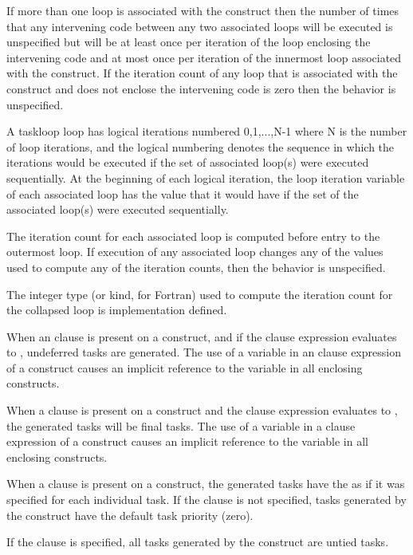 If more than one loop is associated with the  construct
then the number of times that any intervening code between any two
associated loops will be executed is unspecified but will be at least
once per iteration of the loop enclosing the intervening code and at
most once per iteration of the innermost loop associated with the
construct.  If the iteration count of any loop that is associated with the
 construct and does not enclose the intervening code is zero
then the behavior is unspecified.


A taskloop loop has logical iterations numbered 0,1,...,N-1 where N is
the number of loop iterations, and the logical numbering denotes the
sequence in which the iterations would be executed if the set of
associated loop(s) were executed sequentially.  At the beginning of
each logical iteration, the loop iteration variable of each associated
loop has the value that it would have if the set of the associated
loop(s) were executed sequentially.

The iteration count for each associated loop is computed before entry to the outermost loop. If execution of any associated loop changes any of the values used to compute any of the iteration counts, then the behavior is unspecified.

The integer type (or kind, for Fortran) used to compute the iteration count for the collapsed loop is implementation defined.

When an  clause is present on a  construct, and if the  clause expression evaluates to , undeferred tasks are generated. The use of a variable in an  clause expression of a  construct causes an implicit reference to the variable in all enclosing constructs.

When a  clause is present on a  construct and the  clause expression evaluates to , the generated tasks will be final tasks. The use of a variable in a  clause expression of a  construct causes an implicit reference to the variable in all enclosing constructs.

When a  clause is present on a  construct,
the generated tasks have the  as if it was
specified for each individual task.
If the  clause is not specified, tasks generated by
the  construct have the default task priority (zero).

If the  clause is specified, all tasks generated by the  construct are untied tasks.


